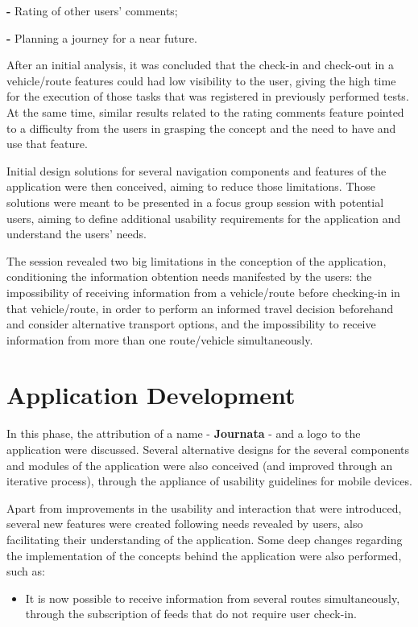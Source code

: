 \documentclass[9pt,a4paper]{extarticle}
\begin{document}
\begin{multicols}{2}
\textbf{-} Rating of other users' comments;

\textbf{-} Planning a journey for a near future.

After an initial analysis, it was concluded that the check-in and check-out in a vehicle/route features could had low visibility to the user, giving the high time for the execution of those tasks that was registered in previously performed tests. At the same time, similar results related to the rating comments feature pointed to a difficulty from the users in grasping the concept and the need to have and use that feature.

Initial design solutions for several navigation components and features of the application were then conceived, aiming to reduce those limitations. Those solutions were meant to be presented in a focus group session with potential users, aiming to define additional usability requirements for the application and understand the users' needs.

The session revealed two big limitations in the conception of the application, conditioning the information obtention needs manifested by the users: the impossibility of receiving information from a vehicle/route before checking-in in that vehicle/route, in order to perform an informed travel decision beforehand and consider alternative transport options, and the impossibility to receive information from more than one route/vehicle simultaneously.

\section{Application Development}

In this phase, the attribution of a name - \textbf{Journata} - and a logo to the application were discussed. Several alternative designs for the several components and modules of the application were also conceived (and improved through an iterative process), through the appliance of usability guidelines for mobile devices.

Apart from improvements in the usability and interaction that were introduced, several new features were created following needs revealed by users, also facilitating their understanding of the application. Some deep changes regarding the implementation of the concepts behind the application were also performed, such as:

\begin{itemize}
\item It is now possible to receive information from several routes simultaneously, through the subscription of feeds that do not require user check-in.


\end{itemize}
\end{multicols}
\end{document}
